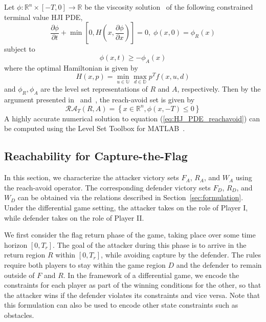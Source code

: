 \documentclass[letterpaper, 10 pt, conference]{ieeeconf}  %
\numberwithin{algorithm}{section}
\begin{document}
Let $\phi: \mathbb{R}^n \times [-T,0] \rightarrow \mathbb{R}$ be the viscosity solution~\cite{j:Crandall-TAMS-1983} of the following constrained terminal value HJI PDE,
\begin{equation}
	\label{eq:HJ_PDE_reachavoid}
	\frac{\partial \phi}{\partial t} + \min \left[0, H\left(x,\frac{\partial \phi}{\partial x}\right)\right] = 0,\;\phi(x,0) = \phi_R(x)	 
\end{equation}
subject to 
$$\phi(x,t) \geq -\phi_A(x)$$
where the optimal Hamiltonian is given by
$$H\left(x,p\right) = \min_{u \in \mathbb{U}} \max_{d \in \mathbb{D}} p^T f(x,u,d)$$
and $\phi_R, \phi_A$ are the level set representations of $R$ and $A$, respectively.  Then by the argument presented in~\cite{j:mitchell-TAC-2005} and~\cite{mitchell-thesis}, the reach-avoid set is given by 
$$\mathcal{RA}_T(R,A) = \left\{x\in \mathbb{R}^n, \phi (x,-T) \leq 0\right\}$$
A highly accurate numerical solution to equation (\ref{eq:HJ_PDE_reachavoid}) can be computed using the Level Set Toolbox for MATLAB~\cite{LSToolbox}.

\subsection{Reachability for Capture-the-Flag}

In this section, we characterize the attacker victory sets $F_A$, $R_A$, and $W_A$ using the reach-avoid operator. The corresponding defender victory sets $F_D$, $R_D$, and $W_D$ can be obtained via the relations described in Section~\ref{sec:formulation}. Under the differential game setting, the attacker takes on the role of Player I, while defender takes on the role of Player II.  

We first consider the flag return phase of the game, taking place over some time horizon $[0,T_r]$. The goal of the attacker during this phase is to arrive in the return region $R$ within $[0,T_r]$, while avoiding capture by the defender. The rules require both players to stay within the game region $D$ and the defender to remain outside of $F$ and $R$. In the framework of a differential game, we encode the constraints for each player as part of the winning conditions for the other, so that the attacker wins if the defender violates its constraints and vice versa. Note that this formulation can also be used to encode other state constraints such as obstacles. 
\end{document}
